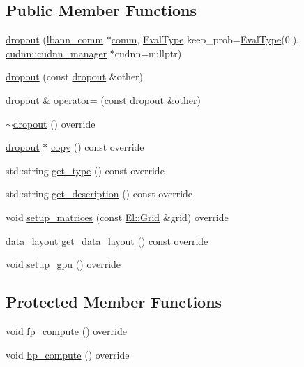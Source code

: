 \subsection*{Public Member Functions}
\begin{DoxyCompactItemize}
\item 
\hyperlink{classlbann_1_1dropout_a301be902f285c5cf1d0cd743119a09d8}{dropout} (\hyperlink{classlbann_1_1lbann__comm}{lbann\+\_\+comm} $\ast$\hyperlink{file__io_8cpp_ab048c6f9fcbcfaa57ce68b00263dbebe}{comm}, \hyperlink{base_8hpp_a3266f5ac18504bbadea983c109566867}{Eval\+Type} keep\+\_\+prob=\hyperlink{base_8hpp_a3266f5ac18504bbadea983c109566867}{Eval\+Type}(0.), \hyperlink{classlbann_1_1cudnn_1_1cudnn__manager}{cudnn\+::cudnn\+\_\+manager} $\ast$cudnn=nullptr)
\item 
\hyperlink{classlbann_1_1dropout_ab2057d4abf48b96f8f6e9f64bdb0fc7e}{dropout} (const \hyperlink{classlbann_1_1dropout}{dropout} \&other)
\item 
\hyperlink{classlbann_1_1dropout}{dropout} \& \hyperlink{classlbann_1_1dropout_a0243b0bc3c2a4239a5ba6d64e6566a15}{operator=} (const \hyperlink{classlbann_1_1dropout}{dropout} \&other)
\item 
\hyperlink{classlbann_1_1dropout_a4b18d1195a176f4dd653767bfc0a9f6b}{$\sim$dropout} () override
\item 
\hyperlink{classlbann_1_1dropout}{dropout} $\ast$ \hyperlink{classlbann_1_1dropout_a0e6e50b50f8c2620315f3257bbab41b3}{copy} () const override
\item 
std\+::string \hyperlink{classlbann_1_1dropout_a4d07cd79c7a4ab29db233a361aede358}{get\+\_\+type} () const override
\item 
std\+::string \hyperlink{classlbann_1_1dropout_a7b53ee7d758337fe40788a567b5d092c}{get\+\_\+description} () const override
\item 
void \hyperlink{classlbann_1_1dropout_abf399d8463721d322aedbb76d60534c6}{setup\+\_\+matrices} (const \hyperlink{base_8hpp_a9951bb1719d534e0401b1f06cad19eab}{El\+::\+Grid} \&grid) override
\item 
\hyperlink{base_8hpp_a786677cbfb3f5677b4d84f3056eb08db}{data\+\_\+layout} \hyperlink{classlbann_1_1dropout_aefeb16614f9bf4b9e643e1d5b48ec62d}{get\+\_\+data\+\_\+layout} () const override
\item 
void \hyperlink{classlbann_1_1dropout_abaa3d0c6d99200b186d0a55201f77b6a}{setup\+\_\+gpu} () override
\end{DoxyCompactItemize}
\subsection*{Protected Member Functions}
\begin{DoxyCompactItemize}
\item 
void \hyperlink{classlbann_1_1dropout_a9ed94f278835b6c9e8185de01705e53a}{fp\+\_\+compute} () override
\item 
void \hyperlink{classlbann_1_1dropout_a053e3f392a6a90b3bcc07f62f3818bce}{bp\+\_\+compute} () override
\end{DoxyCompactItemize}
